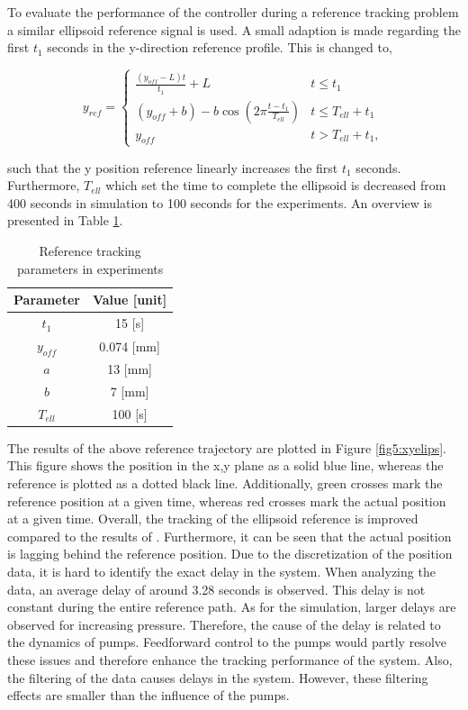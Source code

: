 To evaluate the performance of the controller during a reference tracking problem a similar ellipsoid reference signal is used. A small adaption is made regarding the first $t_1$ seconds in the y-direction reference profile. This is changed to,


\begin{equation}
    y_{ref} = \begin{cases} 
      \frac{(y_{off} - L) t}{t_1} + L&  t \leq t_1 \\
     (y_{off} +b) -  b \cos(2\pi \frac{t - t_1}{T_{ell}}) & t \leq T_{ell} + t_1 \\
     y_{off} & t > T_{ell} + t_1,
   \end{cases} 
\end{equation}

such that the y position reference linearly increases the first $t_1$ seconds. Furthermore, $T_{ell}$ which set the time to complete the ellipsoid is decreased from 400 seconds in simulation to 100 seconds for the experiments. An overview is presented in Table \ref{tab5:refparams}. 


\begin{table}[H]
    \centering
    \caption{Reference tracking parameters in experiments}
    \begin{tabular}{|c|c|} \hline
   \textbf{Parameter}  & \textbf{Value [unit]} \\ \hline
    $t_1$ &   15 [s]  \\ 
    $y_{off}$ & 0.074 [mm] \\
    $a$ & 13 [mm] \\
    $b$ & 7 [mm] \\
    $T_{ell}$ & 100 [s] \\ \hline
\end{tabular}
    \label{tab5:refparams}
\end{table}

The results of the above reference trajectory are plotted in Figure \ref{fig5:xyelips}. This figure shows the position in the x,y plane as a solid blue line, whereas the reference is plotted as a dotted black line. Additionally, green crosses mark the reference position at a given time, whereas red crosses mark the actual position at a given time. Overall, the tracking of the ellipsoid reference is improved compared to the results of \cite{berkers}. Furthermore, it can be seen that the actual position is lagging behind the reference position. Due to the discretization of the position data, it is hard to identify the exact delay in the system. When analyzing the data, an average delay of around 3.28 seconds is observed.  This delay is not constant during the entire reference path. As for the simulation, larger delays are observed for increasing pressure. Therefore, the cause of the delay is related to the dynamics of pumps. Feedforward control to the pumps would partly resolve these issues and therefore enhance the tracking performance of the system. Also, the filtering of the data causes delays in the system. However, these filtering effects are smaller than the influence of the pumps. 

